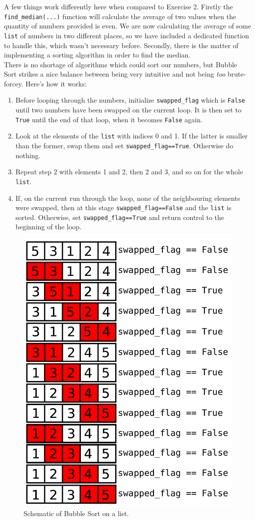 \documentclass{report}
\begin{document}
A few things work differently here when compared to Exercise 2. Firstly the \verb|find_median(...)| function will calculate the average of two values when the quantity of numbers provided is even. We are now calculating the average of some \verb|list| of numbers in two different places, so we have included a dedicated function to handle this, which wasn't necessary before. Secondly, there is the matter of implementing a sorting algorithm in order to find the median.\\
\indent There is no shortage of algorithms which could sort our numbers, but Bubble Sort strikes a nice balance between being very intuitive and not being \textit{too} brute-forcey. Here's how it works:
\vspace{8px}
\begin{enumerate}
\item Before looping through the numbers, initialize \verb|swapped_flag| which is \verb|False| until two numbers have been swapped on the current loop. It is then set to \verb|True| until the end of that loop, when it becomes \verb|False| again.
\item Look at the elements of the \verb|list| with indices 0 and 1. If the latter is smaller than the former, swap them and set \verb|swapped_flag==True|. Otherwise do nothing.
\item Repeat step 2 with elements 1 and 2, then 2 and 3, and so on for the whole  \verb|list|. 
\item If, on the current run through the loop, none of the neighbouring elements were swapped, then at this stage \verb|swapped_flag==False| and the \verb|list| is sorted. Otherwise, set \verb|swapped_flag==True| and return control to the beginning of the loop.
\end{enumerate}
\begin{figure}[h]
\centering
\includegraphics[width=0.8\linewidth]{Graphics/bubble_sort.pdf}
\caption{Schematic of Bubble Sort on a list.}
\label{fig_bubble_sort}
\end{figure}
\end{document}
